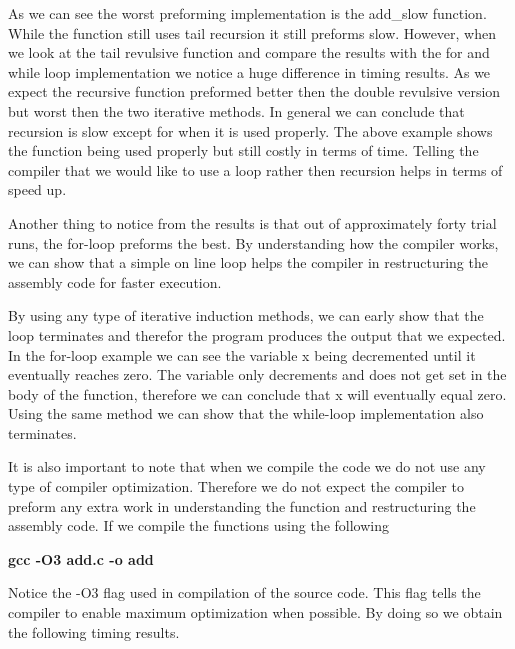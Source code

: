 \documentclass{article}
\begin{document}
As we can see the worst preforming implementation is the add\_slow function. While the function still uses tail recursion it still preforms slow. However, when we look at the tail revulsive function and compare the results with the for and while loop implementation we notice a huge difference in timing results. As we expect the recursive function preformed better then the double revulsive version but worst then the two iterative methods. In general we can conclude that recursion is slow except for when it is used properly. The above example shows the function being used properly but still costly in terms of time. Telling the compiler that we would like to use a loop rather then recursion helps in terms of speed up. 

Another thing to notice from the results is that out of approximately forty trial runs, the for-loop preforms the best. By understanding how the compiler works, we can show that a simple on line loop helps the compiler in restructuring the assembly code for faster execution. 

By using any type of iterative induction methods, we can early show that the loop terminates and therefor the program produces the output that we expected. In the for-loop example we can see the variable x being decremented until it eventually reaches zero. The variable only decrements and does not get set in the body of the function, therefore we can conclude that x will eventually equal zero. Using the same method we can show that the while-loop implementation also terminates. 

It is also important to note that when we compile the code we do not use any type of compiler optimization. Therefore we do not expect the compiler to preform any extra work in understanding the function and restructuring the assembly code. If we compile the functions using the following 

\begin{center} \textbf{gcc -O3 add.c -o add}\end{center}

Notice the -O3 flag used in compilation of the source code. This flag tells the compiler to enable maximum optimization when possible. By doing so we obtain the following timing results.
\end{document}

